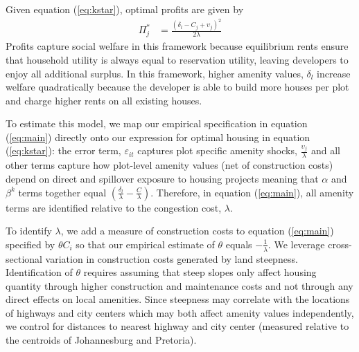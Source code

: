 \documentclass[12pt]{article}
\begin{document}
Given equation (\ref{eq:kstar}), optimal profits are given by
\begin{align}
\label{eq:profits1}
\Pi_{j}^{*}  &= \frac{(\delta_{l}-C_j + \upsilon_{j} )^2}{2\lambda}
\end{align}
Profits capture social welfare in this framework because equilibrium rents ensure that household utility is always equal to reservation utility, leaving developers to enjoy all additional surplus.  In this framework, higher amenity values, $\delta_{l}$ increase welfare quadratically because the developer is able to build more houses per plot and charge higher rents on all existing houses.

To estimate this model, we map our empirical specification in equation (\ref{eq:main}) directly onto our expression for optimal housing in equation (\ref{eq:kstar}): the error term, $\varepsilon_{it}$ captures plot specific amenity shocks, $\frac{\upsilon_{j}}{\lambda}$ and all other terms capture how plot-level amenity values (net of construction costs) depend on direct and spillover exposure to housing projects meaning that $\alpha$ and $\beta^{k}$ terms together equal $(\frac{\delta_{l}}{\lambda} -\frac{C}{\lambda})$.  Therefore, in equation (\ref{eq:main}), all amenity terms are identified relative to the congestion cost, $\lambda$.

To identify $\lambda$, we add a measure of construction costs to equation (\ref{eq:main}) specified by $\theta C_i$ so that our empirical estimate of $\theta$ equals $-\frac{1}{\lambda}$.  We leverage cross-sectional variation in construction costs generated by land steepness.  Identification of $\theta$ requires assuming that steep slopes only affect housing quantity through higher construction and maintenance costs and not through any direct effects on local amenities.  Since steepness may correlate with the locations of highways and city centers which may both affect amenity values independently, we control for distances to nearest highway and city center (measured relative to the centroids of Johannesburg and Pretoria).
\end{document}
